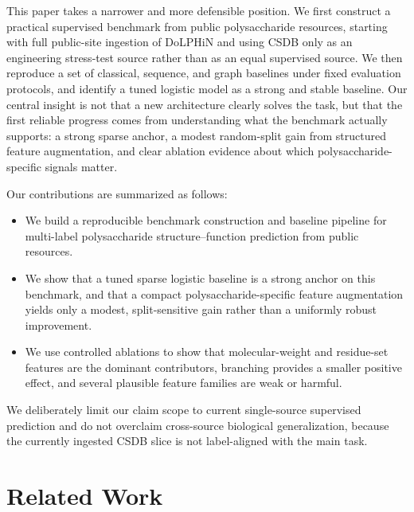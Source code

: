 \documentclass{article}
\begin{document}
This paper takes a narrower and more defensible position. We first construct a practical supervised benchmark from public polysaccharide resources, starting with full public-site ingestion of DoLPHiN and using CSDB only as an engineering stress-test source rather than as an equal supervised source. We then reproduce a set of classical, sequence, and graph baselines under fixed evaluation protocols, and identify a tuned logistic model as a strong and stable baseline. Our central insight is not that a new architecture clearly solves the task, but that the first reliable progress comes from understanding what the benchmark actually supports: a strong sparse anchor, a modest random-split gain from structured feature augmentation, and clear ablation evidence about which polysaccharide-specific signals matter.

Our contributions are summarized as follows:
\begin{itemize}[leftmargin=*,nosep]
\item We build a reproducible benchmark construction and baseline pipeline for multi-label polysaccharide structure--function prediction from public resources.
\item We show that a tuned sparse logistic baseline is a strong anchor on this benchmark, and that a compact polysaccharide-specific feature augmentation yields only a modest, split-sensitive gain rather than a uniformly robust improvement.
\item We use controlled ablations to show that molecular-weight and residue-set features are the dominant contributors, branching provides a smaller positive effect, and several plausible feature families are weak or harmful.
\end{itemize}

We deliberately limit our claim scope to current single-source supervised prediction and do not overclaim cross-source biological generalization, because the currently ingested CSDB slice is not label-aligned with the main task.

\section{Related Work}
\label{sec:related}
\end{document}
